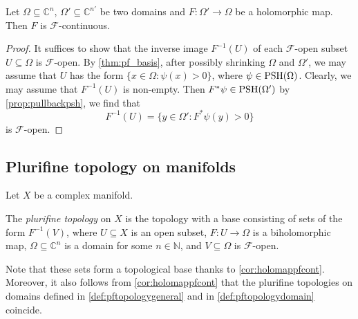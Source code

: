 \begin{corollary}\label{cor:holomappfcont}
    Let $\Omega\subseteq \mathbb{C}^n$, $\Omega'\subseteq \mathbb{C}^{n'}$ be two domains and $F\colon \Omega'\rightarrow \Omega$ be a holomorphic map. Then $F$ is $\mathcal{F}$-continuous.
\end{corollary}

\begin{proof}
    It suffices to show that the inverse image $F^{-1}(U)$ of each $\mathcal{F}$-open subset $U\subseteq \Omega$ is $\mathcal{F}$-open.
    By \cref{thm:pf_basis}, after possibly shrinking $\Omega$ and $\Omega'$, we may assume that $U$ has the form $\{x\in \Omega:\psi(x)>0\}$, where $\psi \in \mathrm{PSH}(\Omega)$. Clearly, we may assume that $F^{-1}(U)$ is non-empty. Then $F^*\psi\in \mathrm{PSH}(\Omega')$ by \cref{prop:pullbackpsh}, we find that
    \[
        F^{-1}(U)=\{y\in \Omega': F^*\psi(y)>0\}
    \]
    is $\mathcal{F}$-open.
\end{proof}


\subsection{Plurifine topology on manifolds}\label{subsec:pftmfd}
Let $X$ be a complex manifold.
\begin{definition}\label{def:pftopologygeneral}
    The \emph{plurifine topology} on $X$ is the topology with a base consisting of sets of the form $F^{-1}(V)$, where $U\subseteq X$ is an open subset, $F\colon U\rightarrow \Omega$ is a biholomorphic map, $\Omega\subseteq \mathbb{C}^n$ is a domain for some $n\in \mathbb{N}$, and $V\subseteq \Omega$ is $\mathcal{F}$-open.
\end{definition}
Note that these sets form a topological base thanks to \cref{cor:holomappfcont}. Moreover, it also follows from \cref{cor:holomappfcont} that the plurifine topologies on domains defined in \cref{def:pftopologygeneral} and in \cref{def:pftopologydomain} coincide.

